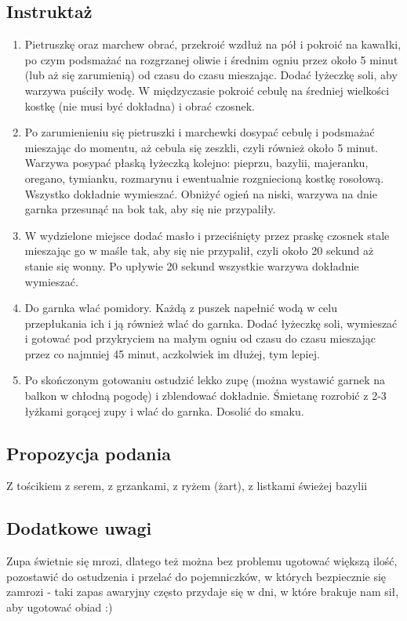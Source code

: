 \subsection*{Instruktaż}
\begin{enumerate}
    \item Pietruszkę oraz marchew obrać, przekroić wzdłuż na pół i pokroić na kawałki, po czym podsmażać na rozgrzanej oliwie i średnim ogniu przez około 5 minut (lub aż się zarumienią) od czasu do czasu mieszając. Dodać łyżeczkę soli, aby warzywa puściły wodę. W międzyczasie pokroić cebulę na średniej wielkości kostkę (nie musi być dokładna) i obrać czosnek.
    \item Po zarumienieniu się pietruszki i marchewki dosypać cebulę i podsmażać mieszając do momentu, aż cebula się zeszkli, czyli również około 5 minut. Warzywa posypać płaską łyżeczką kolejno: pieprzu, bazylii, majeranku, oregano, tymianku, rozmarynu i ewentualnie rozgniecioną kostkę rosołową. Wszystko dokładnie wymieszać. Obniżyć ogień na niski, warzywa na dnie garnka przesunąć na bok tak, aby się nie przypaliły.
    \item W wydzielone miejsce dodać masło i przeciśnięty przez praskę czosnek stale mieszając go w maśle tak, aby się nie przypalił, czyli około 20 sekund aż stanie się wonny. Po upływie 20 sekund wszystkie warzywa dokładnie wymieszać.
    \item Do garnka wlać pomidory. Każdą z puszek napełnić wodą w celu przepłukania ich i ją również wlać do garnka. Dodać łyżeczkę soli, wymieszać i gotować pod przykryciem na małym ogniu od czasu do czasu mieszając przez co najmniej 45 minut, aczkolwiek im dłużej, tym lepiej.
    \item Po skończonym gotowaniu ostudzić lekko zupę (można wystawić garnek na balkon w chłodną pogodę) i zblendować dokładnie. Śmietanę rozrobić z 2-3 łyżkami gorącej zupy i wlać do garnka. Dosolić do smaku.
\end{enumerate}

\vspace{0.5cm}

\small
\subsection*{Propozycja podania}
Z tościkiem z serem, z grzankami, z ryżem (żart), z listkami świeżej bazylii

\vspace{0.3cm}

\subsection*{Dodatkowe uwagi}
Zupa świetnie się mrozi, dlatego też można bez problemu ugotować większą ilość, pozostawić do ostudzenia i przelać do pojemniczków, w których bezpiecznie się zamrozi - taki zapas awaryjny często przydaje się w dni, w które brakuje nam sił, aby ugotować obiad :)

\newpage
